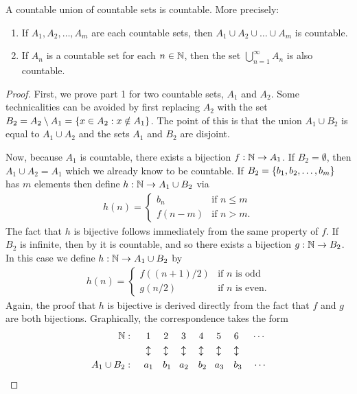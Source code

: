 \documentclass[11pt,twoside=off,numbers=noenddot]{scrbook}
\begin{document}
\begin{theorem}
    A countable union of countable sets is countable. More precisely:
    \begin{enumerate}
        \item If $A_1, A_2, \dots, A_m$ are each countable sets, then $A_1 \cup A_2 \cup \dots \cup A_m$ is countable.
        \item If $A_n$ is a countable set for each $n \in \mathbb N$, then the set $\bigcup_{n = 1}^{\infty} A_n$ is also countable.
    \end{enumerate}
\end{theorem}

\begin{proof}
    First, we prove part 1 for two countable sets, $A_1$ and $A_2$. Some technicalities can be avoided by first replacing $A_2$ with the set $B_2 = A_2 \setminus A_1 = \{ x \in A_2 : x \notin A_1 \}$. The point of this is that the union $A_1 \cup B_2$ is equal to $A_1 \cup A_2$ and the sets $A_1$ and $B_2$ are disjoint.

    Now, because $A_1$ is countable, there exists a bijection $f : \mathbb N \to A_1$. If $B_2 = \emptyset$, then $A_1 \cup A_2 = A_1$ which we already know to be countable. If $B_2 = \{ b_1, b_2, \dots, b_m \}$ has $m$ elements then define $h : \mathbb N \to A_1 \cup B_2$ via
    \begin{align*}
        h(n) = \begin{cases}
            b_n & \text{if $n \leq m$} \\
            f(n - m) & \text{if $n > m$}.
        \end{cases}
    \end{align*}
    The fact that $h$ is bijective follows immediately from the same property of $f$. If $B_2$ is infinite, then by  it is countable, and so there exists a bijection $g : \mathbb N \to B_2$. In this case we define $h : \mathbb N \to A_1 \cup B_2$ by
    \begin{align*}
        h(n) = \begin{cases}
            f((n + 1) / 2) & \text{if $n$ is odd} \\
            g(n / 2) & \text{if $n$ is even}.
        \end{cases}
    \end{align*}
    Again, the proof that $h$ is bijective is derived directly from the fact that $f$ and $g$ are both bijections. Graphically, the correspondence takes the form
    \begin{align*}
        \mathbb N : \quad & \:\:\, 1 \quad\,\, 2 \quad\,\, 3 \quad\,\, 4 \quad\,\, 5 \quad\,\, 6 \quad\,\, \cdots \\
        & \,\, \updownarrow \quad\,\, \updownarrow \quad\,\, \updownarrow \quad\,\, \updownarrow \quad\,\, \updownarrow \quad\,\, \updownarrow \\
        A_1 \cup B_2 : \quad & \:\, a_1 \quad b_1 \,\,\,\,\, a_2 \quad b_2 \,\,\,\,\, a_3 \quad b_3 \:\:\,\,\,\, \cdots
    \end{align*}


\end{proof}
\end{document}
